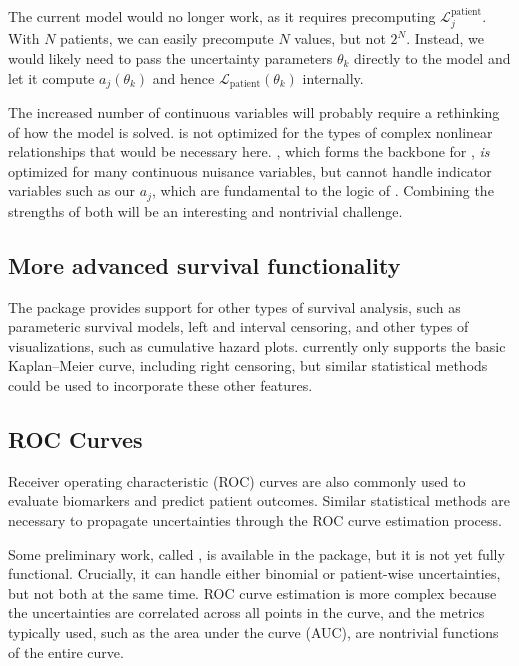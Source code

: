 \documentclass[article]{jss}
\newcommand{\KM}{Kaplan--Meier} %
\begin{document}
The current  model would no longer work, as it requires precomputing \(\mathcal{L}_j^{\text{patient}}\).  With \(N\) patients, we can easily precompute \(N\) values, but not \(2^N\).  Instead, we would likely need to pass the uncertainty parameters \(\theta_k\) directly to the  model and let it compute \(a_j\left(\theta_k\right)\) and hence \(\mathcal{L}_{\text{patient}}\left(\theta_k\right)\) internally.

The increased number of continuous variables will probably require a rethinking of how the model is solved\@.   is not optimized for the types of complex nonlinear relationships that would be necessary here\@.   \citep{minuit}, which forms the backbone for , \emph{is} optimized for many continuous nuisance variables, but cannot handle indicator variables such as our \(a_j\), which are fundamental to the logic of .  Combining the strengths of both will be an interesting and nontrivial challenge.

\subsection{More advanced survival functionality}

The  package provides support for other types of survival analysis, such as parameteric survival models, left and interval censoring, and other types of visualizations, such as cumulative hazard plots\@.   currently only supports the basic \KM{} curve, including right censoring, but similar statistical methods could be used to incorporate these other features.

\subsection{ROC Curves}

Receiver operating characteristic (ROC) curves are also commonly used to evaluate biomarkers and predict patient outcomes.  Similar statistical methods are necessary to propagate uncertainties through the ROC curve estimation process.

Some preliminary work, called , is available in the  package, but it is not yet fully functional.  Crucially, it can handle either binomial or patient-wise uncertainties, but not both at the same time.  ROC curve estimation is more complex because the uncertainties are correlated across all points in the curve, and the metrics typically used, such as the area under the curve (AUC), are nontrivial functions of the entire curve.
\end{document}
